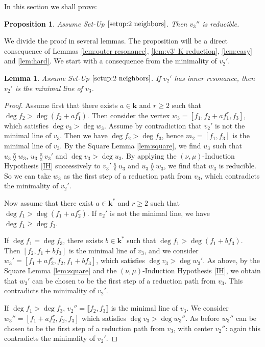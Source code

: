 \documentclass[reqno,oneside,11pt]{amsart}
\theoremstyle{plain}
\newtheorem{proposition}[theorem]{Proposition}
\newtheorem{lemma}[theorem]{Lemma}
\theoremstyle{definition}
\newcommand{\K}{\mathbf{k}}
\renewcommand{\ne}{\between}
\newcommand{\llb}{\llbracket}
\newcommand{\rrb}{\rrbracket}
\renewcommand{\ge}{\geqslant}
\begin{document}
In this section we shall prove:

\begin{proposition} \label{pro:2 neighbors}
Assume Set-Up $\ref{setup:2 neighbors}$.
Then $v_3''$ is reducible.
\end{proposition}

We divide the proof in several lemmas.
The proposition will be a direct consequence of Lemmas \ref{lem:outer
resonance}, \ref{lem:v3' K reduction}, \ref{lem:easy} and \ref{lem:hard}.
We start with a consequence from the minimality of $v_2'$.

\begin{lemma} \label{lem:inner gives minimal}
Assume Set-Up $\ref{setup:2 neighbors}$.
If $v_2'$ has inner resonance, then $v_2'$ is the minimal line of $v_3$.
\end{lemma}

\begin{proof}
Assume first that there exists $a \in \K$ and $r \ge 2$ such that $\deg f_2 > \deg (f_2 + a f_1^r)$.
Then consider the vertex $w_3 = [f_1, f_2 + af_1^r, f_3]$, which satisfies $\deg v_3 > \deg w_3$.
Assume by contradiction that $v_2'$ is not the minimal line of $v_3$.
Then we have $\deg f_2 > \deg f_3$, hence $m_2 = [f_1, f_3]$ is the minimal line of $v_3$.
By the Square Lemma \ref{lem:square}, we find $u_3$ such that $u_3 \ne w_3$, $u_3 \ne v_3'$ and $\deg v_3 > \deg u_3$.
By applying the $(\nu,\mu)$-Induction Hypothesis \ref{IH} successively to $v_3' \ne u_3$ and $u_3 \ne w_3$, we find that $w_3$ is reducible.
So we can take $w_3$ as the first step of a reduction path from $v_3$, which contradicts the minimality of $v_2'$.

Now assume that there exist $a \in \K^*$ and $r \ge 2$ such that $\deg f_1 >
\deg (f_1 + a f_2^r)$.
If $v_2'$ is not the minimal line, we have $\deg f_1 \ge \deg f_3$.

If $\deg f_1 = \deg f_3$, there exists $b \in \K^*$ such that $\deg f_1 > \deg
(f_1 + b f_3)$.
Then $[f_2, f_1 +b f_3]$ is the minimal line of $v_3$, and we consider $w_3' = [f_1 + af_2^r, f_2,f_1 +b f_3]$, which satisfies $\deg v_3 > \deg w_3'$.
As above, by the Square Lemma \ref{lem:square} and the $(\nu,\mu)$-Induction
Hypothesis \ref{IH}, we obtain that $w_3'$ can be chosen to be the first step of
a reduction path from $v_3$.
This contradicts the minimality of $v_2'$.

If $\deg f_1 > \deg f_3$, $v_2'' = \llb f_2, f_3 \rrb$ is the minimal line of $v_3$.
We consider $w_3'' = [f_1 + af_2^r, f_2, f_3]$ which satisfies $\deg v_3 > \deg w_3''$.
As before $w_3''$ can be chosen to be the first step of a reduction path from $v_3$, with center $v_2''$: again this contradicts the minimality of $v_2'$.
\end{proof}
\end{document}
